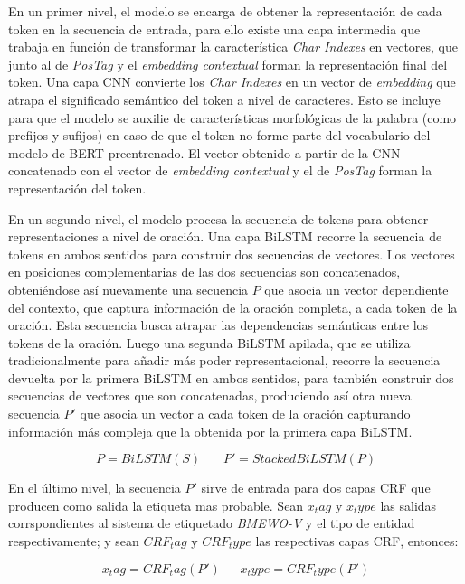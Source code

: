 En un primer nivel, el modelo se encarga de obtener la representaci\'on de cada token en la secuencia de entrada, para ello existe una capa intermedia que trabaja en funci\'on de transformar la caracter\'istica \emph{Char Indexes} en vectores, que junto al de \emph{PosTag} y el \emph{embedding contextual} forman la representaci\'on final del token. Una capa CNN convierte los \emph{Char Indexes} en un vector de \emph{embedding} que atrapa el significado sem\'antico del token a nivel de caracteres. Esto se incluye para que el modelo se auxilie de caracter\'isticas morfol\'ogicas de la palabra (como prefijos y sufijos) en caso de que el token no forme parte del vocabulario del modelo de BERT preentrenado. El vector obtenido a partir de la CNN concatenado con el vector de \emph{embedding contextual} y el de \emph{PosTag} forman la representaci\'on del token.

En un segundo nivel, el modelo procesa la secuencia de tokens para obtener representaciones a nivel de oraci\'on. Una capa BiLSTM recorre la secuencia de tokens en ambos sentidos para construir dos secuencias de vectores. Los vectores en posiciones complementarias de las dos secuencias son concatenados, obteni\'endose as\'i nuevamente una secuencia $P$ que asocia un vector dependiente del contexto, que captura informaci\'on de la oraci\'on completa, a cada token de la oraci\'on. Esta secuencia busca atrapar las dependencias semánticas entre los tokens de la oración.
Luego una segunda BiLSTM apilada, que se utiliza tradicionalmente para a\~nadir m\'as poder representacional, recorre la secuencia devuelta por la primera BiLSTM en ambos sentidos, para tambi\'en construir dos secuencias de vectores que son concatenadas, produciendo as\'i otra nueva secuencia $P'$ que asocia un vector a cada token de la oraci\'on capturando informaci\'on m\'as compleja que la obtenida por la primera capa BiLSTM.

\begin{equation}
	P = BiLSTM(S)~~~~~~~~P' = StackedBiLSTM(P)
\end{equation}

En el \'ultimo nivel, la secuencia $P'$ sirve de entrada para dos capas CRF que producen como salida la etiqueta mas probable. Sean $x_tag$ y $x_type$ las salidas corrspondientes al sistema de etiquetado \emph{BMEWO-V} y el tipo de entidad respectivamente; y sean $CRF_tag$ y $CRF_type$ las respectivas capas CRF, entonces:

\begin{equation}
	x_tag = CRF_tag(P')~~~~~~~x_type = CRF_type(P')
\end{equation}

